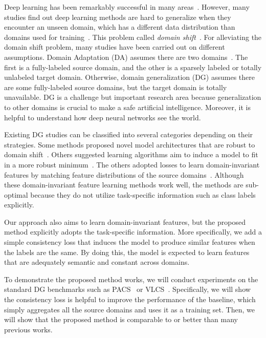 Deep learning has been remarkably successful in many areas~\cite{}. However, many studies find out deep learning methods are hard to generalize when they encounter an unseen domain, which has a different data distribution than domains used for training~\cite{}. This problem called \textit{domain shift}~\cite{}. For alleviating the domain shift problem, many studies have been carried out on different assumptions. Domain Adaptation (DA) assumes there are two domains~\cite{}. The first is a fully-labeled source domain, and the other is a sparsely labeled or totally unlabeled target domain. Otherwise, domain generalization (DG) assumes there are some fully-labeled source domains, but the target domain is totally unavailable. DG is a challenge but important research area because generalization to other domains is crucial to make a safe artificial intelligence. Moreover, it is helpful to understand how deep neural networks see the world.

Existing DG studies can be classified into several categories depending on their strategies. Some methods proposed novel model architectures that are robust to domain shift~\cite{}. Others suggested learning algorithms aim to induce a model to fit in a more robust minimum~\cite{}. The others adopted losses to learn domain-invariant features by matching feature distributions of the source domains~\cite{}. Although these domain-invariant feature learning methods work well, the methods are sub-optimal because they do not utilize task-specific information such as class labels explicitly. 

Our approach also aims to learn domain-invariant features, but the proposed method explicitly adopts the task-specific information. More specifically, we add a simple consistency loss that induces the model to produce similar features when the labels are the same. By doing this, the model is expected to learn features that are adequately semantic and constant across domains.

To demonstrate the proposed method works, we will conduct experiments on the standard DG benchmarks such as PACS~\cite{} or VLCS~\cite{}. Specifically, we will show the consistency loss is helpful to improve the performance of the baseline, which simply aggregates all the source domains and uses it as a training set. Then, we will show that the proposed method is comparable to or better than many previous works.

